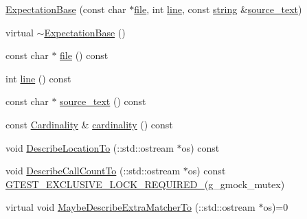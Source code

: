 \begin{DoxyCompactItemize}
\item 
\hyperlink{classtesting_1_1internal_1_1_expectation_base_a8c82a7ecad5831a3ce5ce8cc56ae172d}{Expectation\+Base} (const char $\ast$\hyperlink{classtesting_1_1internal_1_1_expectation_base_a52497eb28bbeba3b7872ebb0a14d1332}{file}, int \hyperlink{classtesting_1_1internal_1_1_expectation_base_a3aa9a71fded4470da4729fd80d3336cd}{line}, const \hyperlink{namespacetesting_1_1internal_a8e8ff5b11e64078831112677156cb111}{string} \&\hyperlink{classtesting_1_1internal_1_1_expectation_base_a11549dfb30eb7fd13e5be1e4e99d7f20}{source\+\_\+text})
\item 
virtual \hyperlink{classtesting_1_1internal_1_1_expectation_base_aff36dabbd1bd194d93a3b2d3c9d3ebbf}{$\sim$\+Expectation\+Base} ()
\item 
const char $\ast$ \hyperlink{classtesting_1_1internal_1_1_expectation_base_a52497eb28bbeba3b7872ebb0a14d1332}{file} () const 
\item 
int \hyperlink{classtesting_1_1internal_1_1_expectation_base_a3aa9a71fded4470da4729fd80d3336cd}{line} () const 
\item 
const char $\ast$ \hyperlink{classtesting_1_1internal_1_1_expectation_base_a11549dfb30eb7fd13e5be1e4e99d7f20}{source\+\_\+text} () const 
\item 
const \hyperlink{classtesting_1_1_cardinality}{Cardinality} \& \hyperlink{classtesting_1_1internal_1_1_expectation_base_a0396ade19a85bc2c43c77d9ef3d5ef1d}{cardinality} () const 
\item 
void \hyperlink{classtesting_1_1internal_1_1_expectation_base_a398914a79c53f90f5fd9fcfac577ddf6}{Describe\+Location\+To} (\+::std\+::ostream $\ast$os) const 
\item 
void \hyperlink{classtesting_1_1internal_1_1_expectation_base_a2beebed3ade29077bcf294b449bb8b9d}{Describe\+Call\+Count\+To} (\+::std\+::ostream $\ast$os) const \hyperlink{gtest-port_8h_a149f693bd59fa1bc937af54c0cdcb32f}{G\+T\+E\+S\+T\+\_\+\+E\+X\+C\+L\+U\+S\+I\+V\+E\+\_\+\+L\+O\+C\+K\+\_\+\+R\+E\+Q\+U\+I\+R\+E\+D\+\_\+}(g\+\_\+gmock\+\_\+mutex)
\item 
virtual void \hyperlink{classtesting_1_1internal_1_1_expectation_base_a5ce4f648c7b112d27b798711d1e3ff5b}{Maybe\+Describe\+Extra\+Matcher\+To} (\+::std\+::ostream $\ast$os)=0
\end{DoxyCompactItemize}
